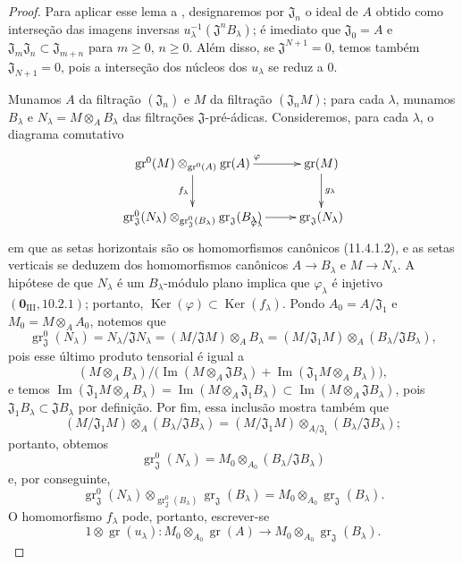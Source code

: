 \begin{proof}
Para aplicar esse lema a
, designaremos por
$\mathfrak J_n$ o ideal de $A$
obtido como interseção das imagens
inversas
$u_\lambda^{-1}(\mathfrak J^n
B_\lambda)$; é imediato que
$\mathfrak J_0=A$ e
$\mathfrak J_m\mathfrak J_n\subset
\mathfrak J_{m+n}$ para
$m\geq0$, $n\geq0$. Além disso,
se $\mathfrak J^{N+1}=0$, temos
também $\mathfrak J_{N+1}=0$,
pois a interseção dos núcleos dos
$u_\lambda$ se reduz a $0$.

Munamos $A$ da filtração
$(\mathfrak J_n)$ e $M$ da
filtração $(\mathfrak J_nM)$; para
cada $\lambda$, munamos
$B_\lambda$ e
$N_\lambda=M\otimes_A B_\lambda$
das filtrações $\mathfrak J$-pré-ádicas.
Consideremos, para cada $\lambda$,
o diagrama comutativo
\[
\xymatrix{
\operatorname{gr}^0(M)
\otimes_{\operatorname{gr}^0(A)}
\operatorname{gr}(A)
 \ar[r]^{\varphi} \ar[d]_{f_\lambda}
 & \operatorname{gr}(M)
 \ar[d]^{g_\lambda} \\
\operatorname{gr}_{\mathfrak J}^0(N_\lambda)
\otimes_{\operatorname{gr}_{\mathfrak J}^0(B_\lambda)}
\operatorname{gr}_{\mathfrak J}(B_\lambda)
 \ar[r]_{\varphi_\lambda}
 & \operatorname{gr}_{\mathfrak J}(N_\lambda)
}
\]
em que as setas horizontais são
os homomorfismos canônicos
(11.4.1.2), e as setas verticais
se deduzem dos homomorfismos
canônicos $A\to B_\lambda$ e
$M\to N_\lambda$. A hipótese de
que $N_\lambda$ é um
$B_\lambda$-módulo plano implica
que $\varphi_\lambda$ é injetivo
$(\mathbf 0_{\mathrm{III}},10.2.1)$;
portanto,
$\operatorname{Ker}(\varphi)\subset
\operatorname{Ker}(f_\lambda)$.
Pondo $A_0=A/\mathfrak J_1$ e
$M_0=M\otimes_A A_0$, notemos que
\[
\operatorname{gr}_{\mathfrak J}^0
(N_\lambda)
=N_\lambda/\mathfrak JN_\lambda
=(M/\mathfrak JM)\otimes_A B_\lambda
=(M/\mathfrak J_1M)\otimes_A
(B_\lambda/\mathfrak JB_\lambda),
\]
pois esse último produto tensorial
é igual a
\[
(M\otimes_A B_\lambda)\Big/
\big(\operatorname{Im}
(M\otimes_A\mathfrak JB_\lambda)
+\operatorname{Im}
(\mathfrak J_1M\otimes_A B_\lambda)\big),
\]
e temos
$\operatorname{Im}
(\mathfrak J_1M\otimes_A B_\lambda)
=\operatorname{Im}
(M\otimes_A\mathfrak J_1B_\lambda)
\subset\operatorname{Im}
(M\otimes_A\mathfrak JB_\lambda)$,
pois $\mathfrak J_1B_\lambda
\subset\mathfrak JB_\lambda$
por definição. Por fim, essa
inclusão mostra também que
\[
(M/\mathfrak J_1M)\otimes_A
(B_\lambda/\mathfrak JB_\lambda)
=(M/\mathfrak J_1M)
\otimes_{A/\mathfrak J_1}
(B_\lambda/\mathfrak JB_\lambda);
\]
portanto, obtemos
\[
\operatorname{gr}_{\mathfrak J}^0
(N_\lambda)
=M_0\otimes_{A_0}
(B_\lambda/\mathfrak JB_\lambda)
\]
e, por conseguinte,
\[
\operatorname{gr}_{\mathfrak J}^0
(N_\lambda)
\otimes_{\operatorname{gr}_{\mathfrak J}^0(B_\lambda)}
\operatorname{gr}_{\mathfrak J}
(B_\lambda)
=M_0\otimes_{A_0}
\operatorname{gr}_{\mathfrak J}
(B_\lambda).
\]
O homomorfismo $f_\lambda$
pode, portanto, escrever-se
\[
1\otimes\operatorname{gr}(u_\lambda):
M_0\otimes_{A_0}\operatorname{gr}(A)
\longrightarrow
M_0\otimes_{A_0}
\operatorname{gr}_{\mathfrak J}(B_\lambda).
\]


\end{proof}
